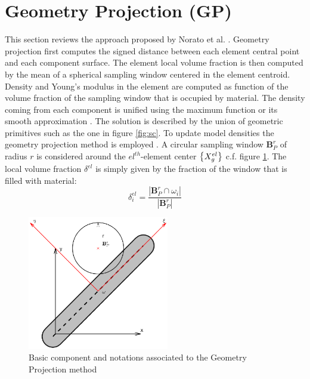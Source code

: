 \section{Geometry Projection (GP)}
\label{GP}
This section reviews the approach proposed by Norato et al. \cite{norato2015geometry}. Geometry projection first computes the signed distance between each element central point and each component surface. The element local volume fraction is then computed by the mean of a spherical sampling window centered in the element centroid. Density and Young's modulus in the element are computed as function of the volume fraction of the sampling window that is occupied by material. The density coming from each component is unified using the maximum function or its smooth approximation \cite{kreisselmeier1980systematic}. The solution is described by the union of geometric primitives such as the one in figure \ref{fig:sc}. To update model densities the geometry projection method is employed \cite{norato2004geometry}. A circular sampling window  $\mathbf{B}_P^r$ of radius $r$ is considered around the $el^{th}$-element center $ \left\{{X_g^{el}}\right\}$ c.f. figure \ref{fig:gp}.
The local volume fraction  $\delta^{el}$ is simply given by the fraction of the window that is filled with material:
\begin{equation}
\label{gpdef}
    \delta^{el}_i=\frac{|\mathbf{B}_P^r\cap\omega_i|}{|\mathbf{B}_P^r|}
\end{equation}
\begin{figure}[ht]
\centering
  \includegraphics[width=0.55\textwidth,trim={0.8cm 0.5cm 0.5cm 0.5cm},clip]{images/Ch3/geometric_projection.eps}
\caption{Basic component and notations associated to the Geometry Projection method \cite{norato2015geometry}}
\label{fig:gp}       %
\end{figure}
